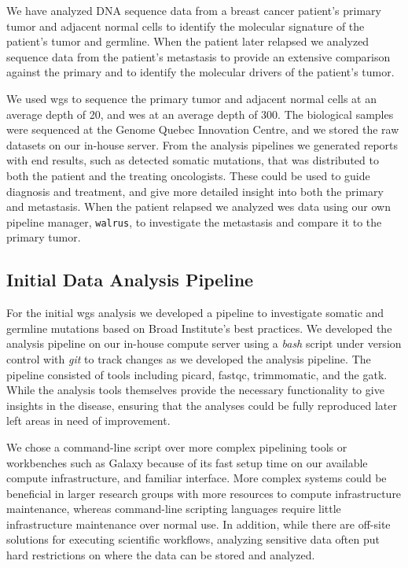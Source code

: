 We have analyzed DNA sequence data from a breast cancer patient's
primary tumor and adjacent normal cells to identify the molecular signature of
the patient's tumor and germline. When the patient  later relapsed we analyzed
sequence data from the patient's metastasis to provide an extensive comparison
against the primary and to identify the molecular drivers of the patient's
tumor. 

We used \gls{wgs} to sequence the primary tumor and adjacent normal cells at an
average depth of 20, and \gls{wes} at an average depth of 300. The biological
samples were sequenced at the Genome Quebec Innovation Centre, and we stored the
raw datasets on our in-house server.  From the analysis pipelines we generated
reports with end results, such as detected somatic mutations, that was
distributed to both the patient and the treating oncologists. These could be
used to guide diagnosis and treatment, and give more detailed insight into both
the primary and metastasis.  When the patient relapsed we analyzed \gls{wes}
data using our own pipeline manager, \texttt{walrus}, to investigate the
metastasis and compare it to the primary tumor. 

\subsection{Initial Data Analysis Pipeline} 

For the initial \gls{wgs} analysis we developed a pipeline to investigate
somatic and germline mutations based on Broad Institute's best practices. We
developed the analysis pipeline on our in-house compute server using a
\emph{bash} script under version control with \emph{git} to track changes as we
developed the analysis pipeline. The pipeline consisted of tools including
picard\cite{picard}, fastqc\cite{fastqc}, trimmomatic\cite{trimmomatic}, and the
\gls{gatk}.\cite{gatk} While the analysis tools themselves provide the necessary
functionality to give insights in the disease, 
ensuring that the analyses could be fully reproduced later left areas in need of
improvement.

We chose a command-line script over more complex pipelining tools or workbenches
such as Galaxy\cite{goecks2010galaxy} because of its fast setup time on our
available compute infrastructure, and familiar interface. More complex systems
could be beneficial in larger research groups with more resources to compute
infrastructure maintenance, whereas command-line scripting languages require
little infrastructure maintenance over normal use. In addition, while there are
off-site solutions for executing scientific workflows, analyzing sensitive data
often put hard restrictions on where the data can be stored and analyzed.

